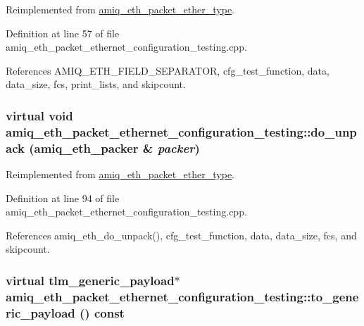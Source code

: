 Reimplemented from \hyperlink{classamiq__eth__packet__ether__type_a9b2852fa1aaf278138fde2232e446f63}{amiq\_\-eth\_\-packet\_\-ether\_\-type}.

Definition at line 57 of file amiq\_\-eth\_\-packet\_\-ethernet\_\-configuration\_\-testing.cpp.

References AMIQ\_\-ETH\_\-FIELD\_\-SEPARATOR, cfg\_\-test\_\-function, data, data\_\-size, fcs, print\_\-lists, and skipcount.\hypertarget{classamiq__eth__packet__ethernet__configuration__testing_aff2640ccc3b20b80b16bb6ab20842f76}{
\subsubsection[{do\_\-unpack}]{\setlength{\rightskip}{0pt plus 5cm}virtual void amiq\_\-eth\_\-packet\_\-ethernet\_\-configuration\_\-testing::do\_\-unpack ({\bf amiq\_\-eth\_\-packer} \& {\em packer})}}
\label{classamiq__eth__packet__ethernet__configuration__testing_aff2640ccc3b20b80b16bb6ab20842f76}


Reimplemented from \hyperlink{classamiq__eth__packet__ether__type_a0c86ef80c46bbed384739b23e5efb0ef}{amiq\_\-eth\_\-packet\_\-ether\_\-type}.

Definition at line 94 of file amiq\_\-eth\_\-packet\_\-ethernet\_\-configuration\_\-testing.cpp.

References amiq\_\-eth\_\-do\_\-unpack(), cfg\_\-test\_\-function, data, data\_\-size, fcs, and skipcount.\hypertarget{classamiq__eth__packet__ethernet__configuration__testing_a0134f20913a67a5dafe334a450be8bb3}{
\subsubsection[{to\_\-generic\_\-payload}]{\setlength{\rightskip}{0pt plus 5cm}virtual tlm\_\-generic\_\-payload$\ast$ amiq\_\-eth\_\-packet\_\-ethernet\_\-configuration\_\-testing::to\_\-generic\_\-payload () const}}
\label{classamiq__eth__packet__ethernet__configuration__testing_a0134f20913a67a5dafe334a450be8bb3}


